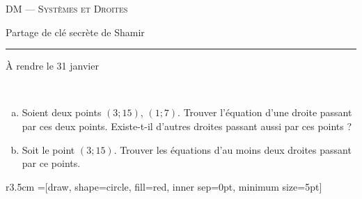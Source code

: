 \documentclass[11pt]{article}
\begin{document}
\begin{center}
  \textsc{DM --- Systèmes et Droites}

  {
    \Large
    Partage de clé secrète de Shamir
    \hrule
  }
\end{center}

\begin{em}
  À rendre le 31 janvier
\end{em}

\begin{question}~
  \begin{enumerate}[(a)]
    \item Soient deux points $(3; 15)$, $(1; 7)$. Trouver l'équation d'une
      droite passant par ces deux points.  Existe-t-il d'autres droites
      passant aussi par ces points ?
    \item Soit le point $(3; 15)$. Trouver les équations d'au moins deux
      droites passant par ce points.
  \end{enumerate}
\end{question}

\begin{wrapfigure}[8]{r}{3.5cm}
  =[draw, shape=circle, fill=red, inner sep=0pt, minimum size=5pt]
\end{wrapfigure}~
\end{document}
